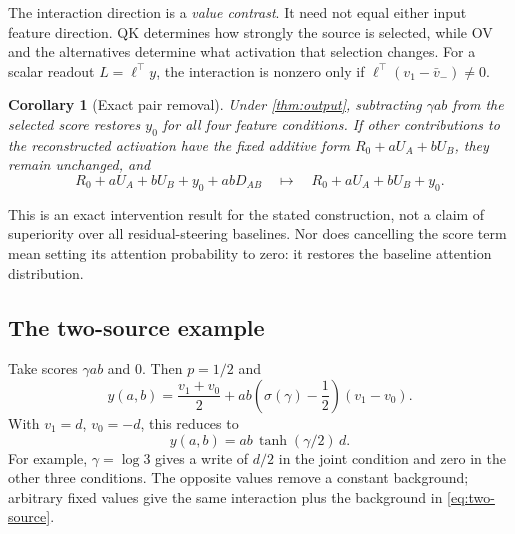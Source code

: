 \documentclass[11pt]{article}
\theoremstyle{plain}
\newtheorem{corollary}[proposition]{Corollary}
\theoremstyle{definition}
\theoremstyle{remark}
\begin{document}
The interaction direction is a \emph{value contrast}. It need not equal either input feature direction. QK determines how strongly the source is selected, while OV and the alternatives determine what activation that selection changes. For a scalar readout $L=\ell^\top y$, the interaction is nonzero only if $\ell^\top(v_1-\bar v_-)\ne0$.

\begin{corollary}[Exact pair removal]\label{cor:removal}
Under \cref{thm:output}, subtracting $\gamma ab$ from the selected score restores $y_0$ for all four feature conditions. If other contributions to the reconstructed activation have the fixed additive form $R_0+aU_A+bU_B$, they remain unchanged, and
\[
 R_0+aU_A+bU_B+y_0+abD_{AB}
 \quad\longmapsto\quad
 R_0+aU_A+bU_B+y_0.
\]
\end{corollary}
This is an exact intervention result for the stated construction, not a claim of superiority over all residual-steering baselines. Nor does cancelling the score term mean setting its attention probability to zero: it restores the baseline attention distribution.

\subsection{The two-source example}
Take scores $\gamma ab$ and $0$. Then $p=1/2$ and
\begin{equation}
 y(a,b)=\frac{v_1+v_0}{2}
   +ab\left(\sigma(\gamma)-\frac12\right)(v_1-v_0).
\label{eq:two-source}
\end{equation}
With $v_1=d$, $v_0=-d$, this reduces to
\begin{equation}
 \boxed{y(a,b)=ab\,\tanh(\gamma/2)\,d.}
\label{eq:opposite-values}
\end{equation}
For example, $\gamma=\log 3$ gives a write of $d/2$ in the joint condition and zero in the other three conditions. The opposite values remove a constant background; arbitrary fixed values give the same interaction plus the background in \cref{eq:two-source}.
\end{document}
